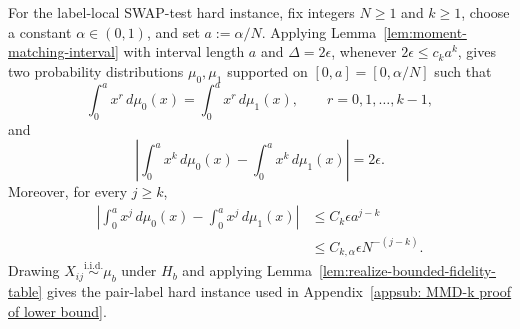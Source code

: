 \documentclass[aps,prx,reprint,superscriptaddress,amsmath,amssymb,longbibliography,floatfix]{revtex4-2}
\theoremstyle{plain}
\theoremstyle{definition}
\theoremstyle{remark}
\begin{document}
For the label-local SWAP-test hard instance, fix integers $N\ge 1$ and $k\ge 1$, choose a constant $\alpha\in(0,1)$, and set $a:=\alpha/N$. Applying Lemma~\ref{lem:moment-matching-interval} with interval length $a$ and $\Delta=2\epsilon$, whenever $2\epsilon\le c_k a^k$, gives two probability distributions $\mu_0,\mu_1$ supported on $[0,a]=[0,\alpha/N]$ such that
\begin{equation*}
    \int_0^a x^r\, d\mu_0(x)
    =
    \int_0^a x^r\, d\mu_1(x),
    \qquad r=0,1,\dots,k-1,
\end{equation*}
and
\begin{equation}
    \left|
    \int_0^a x^k\, d\mu_0(x)
    -
    \int_0^a x^k\, d\mu_1(x)
    \right|
    =
    2\epsilon.
\label{eq:app-pair-label-prescribed-gap}
\end{equation}
Moreover, for every $j\ge k$,
\begin{equation}
\begin{aligned}
\left|
    \int_0^a x^j\, d\mu_0(x)
    -
    \int_0^a x^j\, d\mu_1(x)
    \right|
    &\le
    C_k\epsilon a^{j-k}\\
    &\le
    C_{k,\alpha}\epsilon N^{-(j-k)}.
\end{aligned}
\label{eq:app-pair-label-higher-moment-scaling}
\end{equation}
Drawing $X_{ij}\overset{\mathrm{i.i.d.}}{\sim}\mu_b$ under $H_b$ and applying Lemma~\ref{lem:realize-bounded-fidelity-table} gives the pair-label hard instance used in Appendix~\ref{appsub: MMD-k proof of lower bound}.
\end{document}

